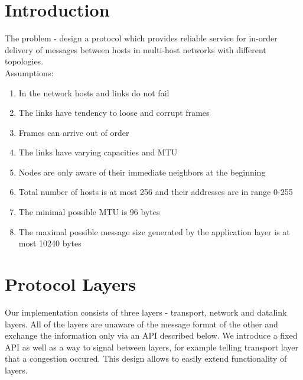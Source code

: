 \documentclass[11pt,a4paper,oneside]{report}
\begin{document}
\lstset{language=C}
\setcounter{secnumdepth}{1}


\title{}
\author{Group 7: \\ Igor Stassiy, Kirill Afanasev,Sanjar Karaev}
\date{\today}
\maketitle

\section*{Introduction}

  The problem - design a protocol which provides reliable service for
  in-order delivery of messages between hosts in multi-host networks with
  different topologies.  \\
  
  Assumptions:
  \begin{enumerate}
    \item In the network hosts and links do not fail
    \item The links have tendency to loose and corrupt frames
    \item Frames can arrive out of order
    \item The links have varying capacities and MTU
    \item Nodes are only aware of their immediate neighbors at the beginning
    \item Total number of hosts is at most 256 and their addresses are in range
    0-255
    \item The minimal possible MTU is 96 bytes
    \item The maximal possible message size generated by the application layer 
    is at most 10240 bytes 
  \end{enumerate}
  
\section*{Protocol Layers}
Our implementation consists of three layers - transport, network
and datalink layers. All of the layers are unaware of the message format of
the other and exchange the information only via an API described below. We
introduce a fixed API as well as a way to signal between layers, for example
telling transport layer that a congestion occured. This design allows to
easily extend functionality of layers.\\
\end{document}
